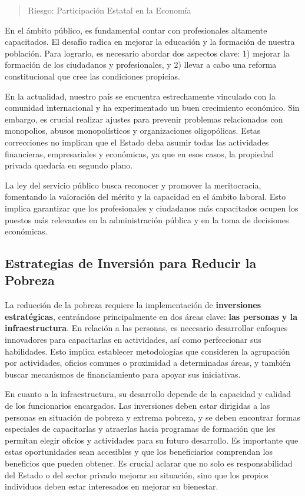 \documentclass[
  jou,
  floatsintext,
  longtable,
  a4paper,
  nolmodern,
  notxfonts,
  notimes,
  12pt,
  colorlinks=true,linkcolor=blue,citecolor=blue,urlcolor=blue]{apa7}
\begin{document}
\begin{quote}
Riesgo: Participación Estatal en la Economía
\end{quote}

En el ámbito público, es fundamental contar con profesionales altamente
capacitados. El desafío radica en mejorar la educación y la formación de
nuestra población. Para lograrlo, es necesario abordar dos aspectos
clave: 1) mejorar la formación de los ciudadanos y profesionales, y 2)
llevar a cabo una reforma constitucional que cree las condiciones
propicias.

En la actualidad, nuestro país se encuentra estrechamente vinculado con
la comunidad internacional y ha experimentado un buen crecimiento
económico. Sin embargo, es crucial realizar ajustes para prevenir
problemas relacionados con monopolios, abusos monopolísticos y
organizaciones oligopólicas. Estas correcciones no implican que el
Estado deba asumir todas las actividades financieras, empresariales y
económicas, ya que en esos casos, la propiedad privada quedaría en
segundo plano.

La ley del servicio público busca reconocer y promover la meritocracia,
fomentando la valoración del mérito y la capacidad en el ámbito laboral.
Esto implica garantizar que los profesionales y ciudadanos más
capacitados ocupen los puestos más relevantes en la administración
pública y en la toma de decisiones económicas.

\subsection{Estrategias de Inversión para Reducir la
Pobreza}\label{estrategias-de-inversiuxf3n-para-reducir-la-pobreza}

La reducción de la pobreza requiere la implementación de
\textbf{inversiones estratégicas}, centrándose principalmente en dos
áreas clave: \textbf{las personas y la infraestructura}. En relación a
las personas, es necesario desarrollar enfoques innovadores para
capacitarlas en actividades, así como perfeccionar sus habilidades. Esto
implica establecer metodologías que consideren la agrupación por
actividades, oficios comunes o proximidad a determinadas áreas, y
también buscar mecanismos de financiamiento para apoyar sus iniciativas.

En cuanto a la infraestructura, su desarrollo depende de la capacidad y
calidad de los funcionarios encargados. Las inversiones deben estar
dirigidas a las personas en situación de pobreza y extrema pobreza, y se
deben encontrar formas especiales de capacitarlas y atraerlas hacia
programas de formación que les permitan elegir oficios y actividades
para su futuro desarrollo. Es importante que estas oportunidades sean
accesibles y que los beneficiarios comprendan los beneficios que pueden
obtener. Es crucial aclarar que no solo es responsabilidad del Estado o
del sector privado mejorar su situación, sino que los propios individuos
deben estar interesados en mejorar su bienestar.
\end{document}
